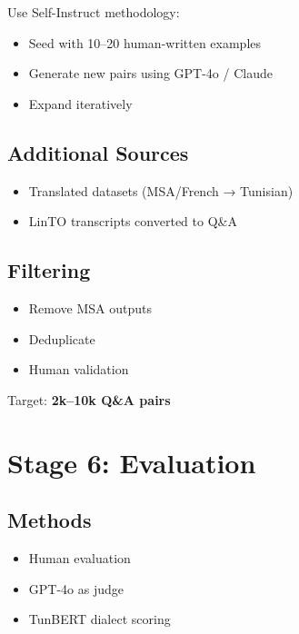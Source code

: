 \documentclass[12pt,a4paper]{report}
\begin{document}
Use Self-Instruct methodology:

\begin{itemize}
    \item Seed with 10--20 human-written examples
    \item Generate new pairs using GPT-4o / Claude
    \item Expand iteratively
\end{itemize}

\subsection{Additional Sources}

\begin{itemize}
    \item Translated datasets (MSA/French → Tunisian)
    \item LinTO transcripts converted to Q\&A
\end{itemize}

\subsection{Filtering}

\begin{itemize}
    \item Remove MSA outputs
    \item Deduplicate
    \item Human validation
\end{itemize}

Target: \textbf{2k--10k Q\&A pairs}

\section{Stage 6: Evaluation}

\subsection{Methods}

\begin{itemize}
    \item Human evaluation
    \item GPT-4o as judge
    \item TunBERT dialect scoring
\end{itemize}
\end{document}

